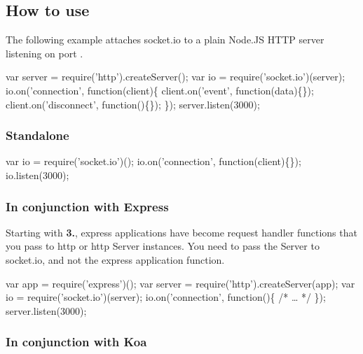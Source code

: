 \href{https://travis-ci.org/socketio/socket.io}{\tt } \href{https://david-dm.org/socketio/socket.io}{\tt } \href{https://david-dm.org/socketio/socket.io#info=devDependencies}{\tt } \href{https://www.npmjs.com/package/socket.io}{\tt }  \href{http://slack.socket.io}{\tt }

\subsection*{How to use}

The following example attaches socket.\+io to a plain Node.\+JS H\+T\+TP server listening on port {}.


\begin{DoxyCode}
var server = require('http').createServer();
var io = require('socket.io')(server);
io.on('connection', function(client)\{
  client.on('event', function(data)\{\});
  client.on('disconnect', function()\{\});
\});
server.listen(3000);
\end{DoxyCode}


\subsubsection*{Standalone}


\begin{DoxyCode}
var io = require('socket.io')();
io.on('connection', function(client)\{\});
io.listen(3000);
\end{DoxyCode}


\subsubsection*{In conjunction with Express}

Starting with {\bfseries 3.}, express applications have become request handler functions that you pass to {\ttfamily http} or {\ttfamily http} {\ttfamily Server} instances. You need to pass the {\ttfamily Server} to {\ttfamily socket.\+io}, and not the express application function.


\begin{DoxyCode}
var app = require('express')();
var server = require('http').createServer(app);
var io = require('socket.io')(server);
io.on('connection', function()\{ /* … */ \});
server.listen(3000);
\end{DoxyCode}


\subsubsection*{In conjunction with Koa}

